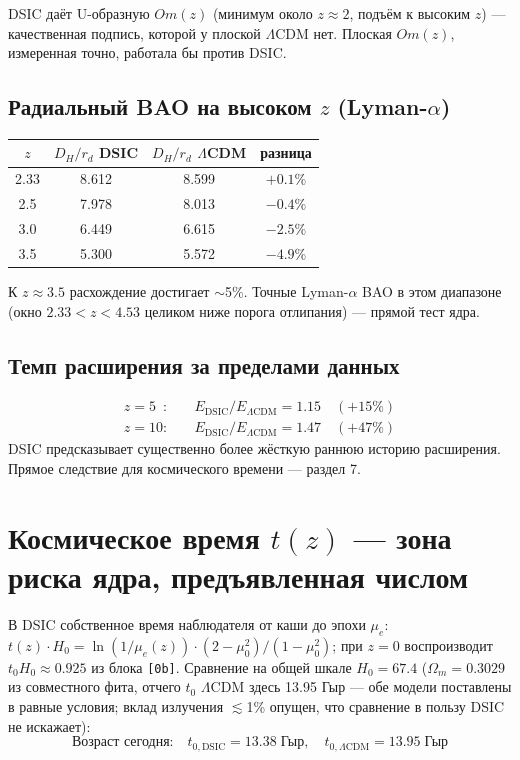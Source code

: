 \documentclass{article}
\begin{document}
DSIC даёт U-образную $Om(z)$ (минимум около $z \approx 2$, подъём к высоким $z$) --- качественная подпись, которой у плоской $\Lambda$CDM нет. Плоская $Om(z)$, измеренная точно, работала бы против DSIC.

\subsection{Радиальный BAO на высоком $z$ (Lyman-$\alpha$)}

\begin{center}
\small
\begin{tabular}{@{}cccc@{}}
\toprule
$z$ & $D_H/r_d$ DSIC & $D_H/r_d$ $\Lambda$CDM & разница \\
\midrule
2.33 & 8.612 & 8.599 & $+0.1\%$ \\
2.5 & 7.978 & 8.013 & $-0.4\%$ \\
3.0 & 6.449 & 6.615 & $-2.5\%$ \\
3.5 & 5.300 & 5.572 & $-4.9\%$ \\
\bottomrule
\end{tabular}
\end{center}

К $z \approx 3.5$ расхождение достигает $\sim$5\%. Точные Lyman-$\alpha$ BAO в этом диапазоне (окно $2.33 < z < 4.53$ целиком ниже порога отлипания) --- прямой тест ядра.

\subsection{Темп расширения за пределами данных}
\begin{align*}
z = 5\phantom{0}: &\quad E_{\text{DSIC}} / E_{\Lambda\text{CDM}} = 1.15 \quad (+15\%) \\
z = 10: &\quad E_{\text{DSIC}} / E_{\Lambda\text{CDM}} = 1.47 \quad (+47\%)
\end{align*}
DSIC предсказывает существенно более жёсткую раннюю историю расширения. Прямое следствие для космического времени --- раздел 7.
\section{Космическое время $t(z)$ --- зона риска ядра, предъявленная числом}

В DSIC собственное время наблюдателя от каши до эпохи $\mu_e$: $t(z)\cdot H_0 = \ln(1/\mu_e(z))\cdot(2-\mu_0^2)/(1-\mu_0^2)$; при $z = 0$ воспроизводит $t_0 H_0 \approx 0.925$ из блока \texttt{[0b]}. Сравнение на общей шкале $H_0 = 67.4$ ($\Omega_m = 0.3029$ из совместного фита, отчего $t_0$ $\Lambda$CDM здесь 13.95 Гыр --- обе модели поставлены в равные условия; вклад излучения $\lesssim$1\% опущен, что сравнение в пользу DSIC не искажает):
\begin{equation*}
\text{Возраст сегодня:}\quad t_{0,\text{DSIC}} = 13.38\;\text{Гыр},\quad t_{0,\Lambda\text{CDM}} = 13.95\;\text{Гыр}
\end{equation*}
\end{document}
